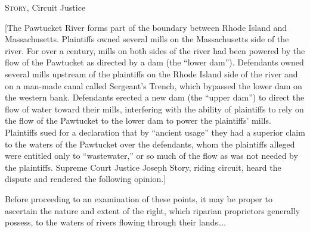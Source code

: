 

\opinion \textsc{Story}, Circuit Justice

[The Pawtucket River forms part of the boundary between Rhode Island and
Massachusetts. Plaintiffs owned several mills on the Massachusetts side of the
river. For over a century, mills on both sides of the river had been powered by
the flow of the Pawtucket as directed by a dam (the ``lower dam''). Defendants
owned several mills upstream of the plaintiffs on the Rhode Island side of the
river and on a man-made canal called Sergeant's Trench, which bypassed the lower
dam on the western bank. Defendants erected a new dam (the ``upper dam'') to
direct the flow of water toward their mills, interfering with the ability of
plaintiffs to rely on the flow of the Pawtucket to the lower dam to power the
plaintiffs' mills. Plaintiffs sued for a declaration that by ``ancient usage''
they had a superior claim to the waters of the Pawtucket over the defendants,
whom the plaintiffs alleged were entitled only to ``wastewater,'' or so much of
the flow as was not needed by the plaintiffs. Supreme Court Justice Joseph
Story, riding circuit, heard the dispute and rendered the following opinion.]

Before proceeding to an examination of these points, it may be proper to
ascertain the nature and extent of the right, which riparian proprietors
generally possess, to the waters of rivers flowing through their lands\ldots .

